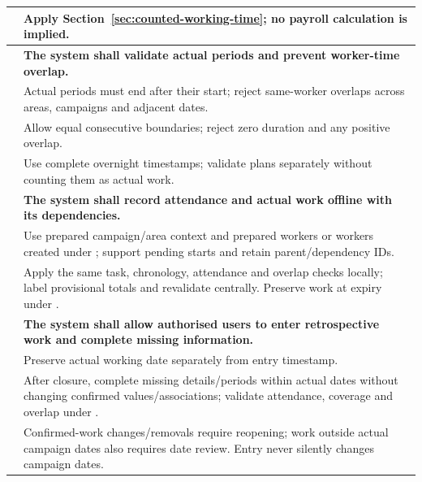 {\begin{longtable}{L{0.18}L{0.82}}
\label{ac:032:c} & Apply Section~\ref{sec:counted-working-time}; no payroll calculation is implied.\\
\midrule
{}
\label{fr:033}\textbf{} & \textbf{The system shall validate actual periods and prevent worker-time overlap.}\\*
\label{ac:033:a} & Actual periods must end after their start; reject same-worker overlaps across areas, campaigns and adjacent dates.\\
\label{ac:033:b} & Allow equal consecutive boundaries; reject zero duration and any positive overlap.\\
\label{ac:033:c} & Use complete overnight timestamps; validate plans separately without counting them as actual work.\\
\midrule
{}
\label{fr:034}\textbf{} & \textbf{The system shall record attendance and actual work offline with its dependencies.}\\*
\label{ac:034:a} & Use prepared campaign/area context and prepared workers or workers created under ; support pending  starts and retain parent/dependency IDs.\\
\label{ac:034:b} & Apply the same task, chronology, attendance and overlap checks locally; label provisional totals and revalidate centrally. Preserve work at expiry under .\\
\midrule
{}
\label{fr:035}\textbf{} & \textbf{The system shall allow authorised users to enter retrospective work and complete missing information.}\\*
\label{ac:035:a} & Preserve actual working date separately from entry timestamp.\\
\label{ac:035:b} & After closure, complete missing details/periods within actual dates without changing confirmed values/associations; validate attendance, coverage and overlap under .\\
\label{ac:035:c} & Confirmed-work changes/removals require reopening; work outside actual campaign dates also requires date review. Entry never silently changes campaign dates.\\

\end{longtable}}
